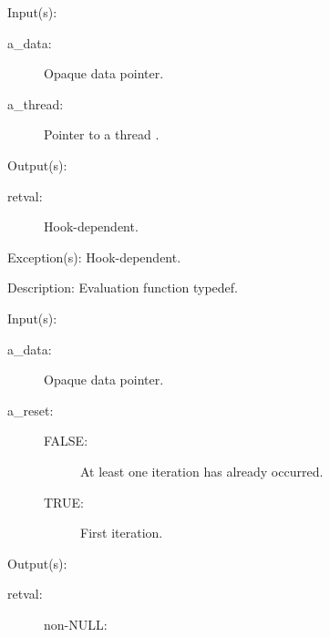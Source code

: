 \begin{capi}
\label{cw_nxo_hook_eval_t}
	\begin{capilist}
	\item[Input(s): ]
		\begin{description}\item[]
		\item[a\_data: ]
			Opaque data pointer.
		\item[a\_thread: ]
			Pointer to a thread .
		\end{description}
	\item[Output(s): ]
		\begin{description}\item[]
		\item[retval: ]
			Hook-dependent.
		\end{description}
	\item[Exception(s): ] Hook-dependent.
	\item[Description: ]
		Evaluation function typedef.
	\end{capilist}
\label{cw_nxo_hook_ref_iter_t}
	\begin{capilist}
	\item[Input(s): ]
		\begin{description}\item[]
		\item[a\_data: ]
			Opaque data pointer.
		\item[a\_reset: ]
			\begin{description}\item[]
			\item[FALSE: ]
				At least one iteration has already occurred.
			\item[TRUE: ]
				First iteration.
			\end{description}
		\end{description}
	\item[Output(s): ]
		\begin{description}\item[]
		\item[retval: ]
			\begin{description}\item[]
			\item[non-NULL: ]

\end{description}
\end{description}
\end{capilist}
\end{capi}
